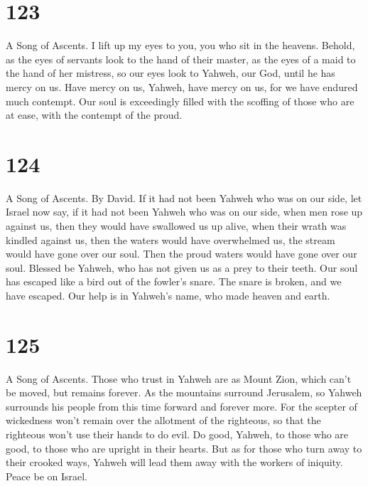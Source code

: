\hypertarget{section-113}{%
\section{123}\label{section-113}}

A Song of Ascents.  I lift up my eyes to you, you who sit in
the heavens.  Behold, as the eyes of servants look to the
hand of their master, as the eyes of a maid to the hand of her mistress,
so our eyes look to Yahweh, our God, until he has mercy on us.
 Have mercy on us, Yahweh, have mercy on us, for we have
endured much contempt.  Our soul is exceedingly filled with
the scoffing of those who are at ease, with the contempt of the proud.

\hypertarget{section-114}{%
\section{124}\label{section-114}}

A Song of Ascents. By David.  If it had not been Yahweh who
was on our side, let Israel now say,  if it had not been
Yahweh who was on our side, when men rose up against us, 
then they would have swallowed us up alive, when their wrath was kindled
against us,  then the waters would have overwhelmed us, the
stream would have gone over our soul.  Then the proud waters
would have gone over our soul.  Blessed be Yahweh, who has
not given us as a prey to their teeth.  Our soul has escaped
like a bird out of the fowler's snare. The snare is broken, and we have
escaped.  Our help is in Yahweh's name, who made heaven and
earth.

\hypertarget{section-115}{%
\section{125}\label{section-115}}

A Song of Ascents.  Those who trust in Yahweh are as Mount
Zion, which can't be moved, but remains forever.  As the
mountains surround Jerusalem, so Yahweh surrounds his people from this
time forward and forever more.  For the scepter of
wickedness won't remain over the allotment of the righteous, so that the
righteous won't use their hands to do evil.  Do good,
Yahweh, to those who are good, to those who are upright in their hearts.
 But as for those who turn away to their crooked ways,
Yahweh will lead them away with the workers of iniquity. Peace be on
Israel.

